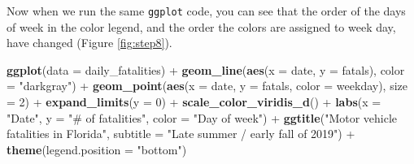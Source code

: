 \documentclass[]{tufte-book}
\newenvironment{Shaded}{}{}
\newcommand{\DataTypeTok}[1]{\textcolor[rgb]{0.56,0.13,0.00}{#1}}
\newcommand{\DecValTok}[1]{\textcolor[rgb]{0.25,0.63,0.44}{#1}}
\newcommand{\KeywordTok}[1]{\textcolor[rgb]{0.00,0.44,0.13}{\textbf{#1}}}
\newcommand{\NormalTok}[1]{#1}
\newcommand{\OperatorTok}[1]{\textcolor[rgb]{0.40,0.40,0.40}{#1}}
\newcommand{\StringTok}[1]{\textcolor[rgb]{0.25,0.44,0.63}{#1}}
\begin{document}
\begin{Shaded}
\end{Shaded}

Now when we run the same \texttt{ggplot} code, you can see that the order of the days of
week in the color legend, and the order the colors are assigned to week day, have
changed (Figure \ref{fig:step8}).

\begin{Shaded}
\begin{Highlighting}[]
\KeywordTok{ggplot}\NormalTok{(}\DataTypeTok{data =}\NormalTok{ daily_fatalities) }\OperatorTok{+}\StringTok{ }\KeywordTok{geom_line}\NormalTok{(}\KeywordTok{aes}\NormalTok{(}\DataTypeTok{x =}\NormalTok{ date, }
    \DataTypeTok{y =}\NormalTok{ fatals), }\DataTypeTok{color =} \StringTok{"darkgray"}\NormalTok{) }\OperatorTok{+}\StringTok{ }\KeywordTok{geom_point}\NormalTok{(}\KeywordTok{aes}\NormalTok{(}\DataTypeTok{x =}\NormalTok{ date, }
    \DataTypeTok{y =}\NormalTok{ fatals, }\DataTypeTok{color =}\NormalTok{ weekday), }\DataTypeTok{size =} \DecValTok{2}\NormalTok{) }\OperatorTok{+}\StringTok{ }
\StringTok{    }\KeywordTok{expand_limits}\NormalTok{(}\DataTypeTok{y =} \DecValTok{0}\NormalTok{) }\OperatorTok{+}\StringTok{ }\KeywordTok{scale_color_viridis_d}\NormalTok{() }\OperatorTok{+}\StringTok{ }
\StringTok{    }\KeywordTok{labs}\NormalTok{(}\DataTypeTok{x =} \StringTok{"Date"}\NormalTok{, }\DataTypeTok{y =} \StringTok{"# of fatalities"}\NormalTok{, }\DataTypeTok{color =} \StringTok{"Day of week"}\NormalTok{) }\OperatorTok{+}\StringTok{ }
\StringTok{    }\KeywordTok{ggtitle}\NormalTok{(}\StringTok{"Motor vehicle fatalities in Florida"}\NormalTok{, }
        \DataTypeTok{subtitle =} \StringTok{"Late summer / early fall of 2019"}\NormalTok{) }\OperatorTok{+}\StringTok{ }
\StringTok{    }\KeywordTok{theme}\NormalTok{(}\DataTypeTok{legend.position =} \StringTok{"bottom"}\NormalTok{)}
\end{Highlighting}
\end{Shaded}
\end{document}
